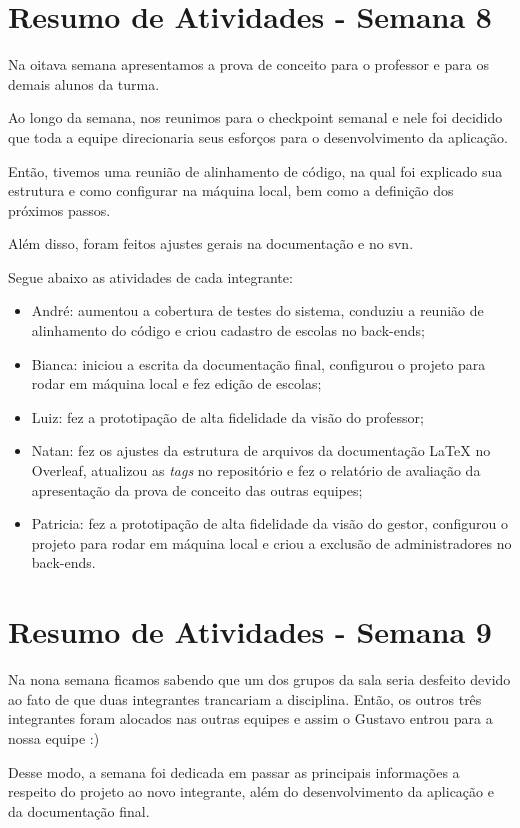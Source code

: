 \begin{apendicesenv}
\section{Resumo de Atividades - Semana 8}
Na oitava semana apresentamos a prova de conceito para o professor e para os demais alunos da turma.

Ao longo da semana, nos reunimos para o \gls{checkpoint} semanal e nele foi decidido que toda a equipe direcionaria seus esforços para o desenvolvimento da aplicação.

Então, tivemos uma reunião de alinhamento de código, na qual foi explicado sua estrutura e como configurar na máquina local, bem como a definição dos próximos passos.

Além disso, foram feitos ajustes gerais na documentação e no \ac{svn}.

Segue abaixo as atividades de cada integrante:

\begin{itemize}
\item André: aumentou a cobertura de testes do sistema, conduziu a reunião de alinhamento do código e criou cadastro de escolas no \glspl{back-end};
\item Bianca: iniciou a escrita da documentação final, configurou o projeto para rodar em máquina local e fez edição de escolas;
\item Luiz: fez a prototipação de alta fidelidade da visão do professor;
\item Natan: fez os ajustes da estrutura de arquivos da documentação LaTeX no Overleaf, atualizou as \textit{tags} no repositório e fez o relatório de avaliação da apresentação da prova de conceito das outras equipes; 
\item Patricia: fez a prototipação de alta fidelidade da visão do gestor, configurou o projeto para rodar em máquina local e criou a exclusão de administradores no \glspl{back-end}.
\end{itemize}

\section{Resumo de Atividades - Semana 9}
Na nona semana ficamos sabendo que um dos grupos da sala seria desfeito devido ao fato de que duas integrantes trancariam a disciplina. Então, os outros três integrantes foram alocados nas outras equipes e assim o Gustavo entrou para a nossa equipe :)

Desse modo, a semana foi dedicada em passar as principais informações a respeito do projeto ao novo integrante, além do desenvolvimento da aplicação e da documentação final.


\end{apendicesenv}

